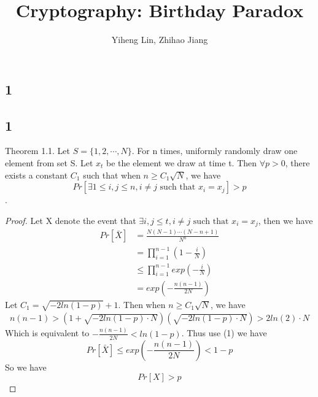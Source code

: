 \documentclass{article}
\title{\textmd{\bf Cryptography: Birthday Paradox}}
\date{}
\author{Yiheng Lin, Zhihao Jiang}
\begin{document}
    \begin{spacing}{1.1}
    \maketitle %
    
    
    \section*{1}
    \subsection*{1}
    Theorem 1.1. Let $S = \{1, 2, \cdots, N\}$. For n times, uniformly randomly draw one element from set S. Let $x_t$ be the element we draw at time t. Then $\forall p > 0$, there exists a constant $C_1$ such that when $n \geq C_1 \sqrt{N}$, we have
    $$Pr[\exists 1\leq i, j \leq n, i\not = j \text{ such that } x_i = x_j] > p$$.
    \begin{proof}
        Let X denote the event that $\exists i, j \leq t, i\not = j \text{ such that } x_i = x_j$, then we have
        \begin{equation}
            \begin{aligned}
                Pr[\bar{X}] &= \frac{N(N-1)\cdots (N-n+1)}{N^n}\\
                &= \prod_{i=1}^{n-1}(1 - \frac{i}{N})\\
                &\leq \prod_{i=1}^{n-1} exp(-\frac{i}{N})\\
                &= exp(-\frac{n(n-1)}{2N})
            \end{aligned}
        \end{equation}
        Let $C_1 = \sqrt{-2ln(1 - p)} + 1$. Then when $n \geq C_1\sqrt{N}$, we have
        \begin{equation}
            \begin{aligned}
                n(n-1) > (1 + \sqrt{-2ln(1 - p)\cdot N})(\sqrt{-2ln(1 - p)\cdot N}) > 2ln(2)\cdot N
            \end{aligned}
        \end{equation}
        Which is equivalent to $-\frac{n(n-1)}{2N} < ln(1 - p)$.
        Thus use (1) we have
        $$Pr[\bar{X}] \leq exp(-\frac{n(n-1)}{2N}) < 1 - p$$
        So we have
        $$Pr[X] > p$$
    \end{proof}

\end{spacing}
\end{document}
